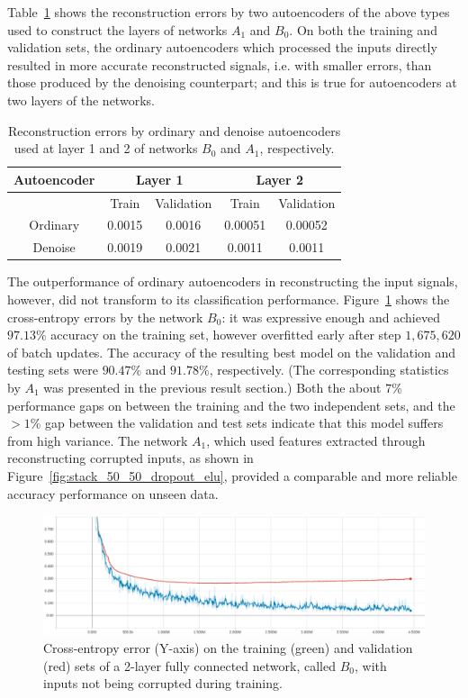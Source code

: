 \documentclass[12pt]{article}
\begin{document}
Table~\ref{tab:reconstruction_errors} shows the reconstruction errors by two autoencoders of the above types used to construct the layers of networks $A_1$ and $B_0$. On both the training and validation sets, the ordinary autoencoders which processed the inputs directly resulted in more accurate reconstructed signals, i.e. with smaller errors, than those produced by the denoising counterpart; and this is true for autoencoders at two layers of the networks.

\begin{table}[!htbp]
\centering
\begin{tabular}{*5c}
\toprule
Autoencoder &  \multicolumn{2}{c}{Layer 1} & \multicolumn{2}{c}{Layer 2}\\
\midrule
{}         & Train   & Validation    & Train   & Validation\\
Ordinary   & 0.0015  & 0.0016   & 0.00051  & 0.00052\\
Denoise    &  0.0019  &  0.0021   & 0.0011  & 0.0011\\
\bottomrule
\end{tabular}
\caption{Reconstruction errors by ordinary and denoise autoencoders used at layer 1 and 2 of networks $B_0$ and $A_1$, respectively.}
\label{tab:reconstruction_errors}
\end{table}

The outperformance of ordinary autoencoders in reconstructing the input signals, however, did not transform to its classification performance. Figure~\ref{fig:stack_50_50_dropout_elu_clean_input} shows the cross-entropy errors by the network $B_0$: it was expressive enough and achieved $97.13\%$ accuracy on the training set, however overfitted early after step $1,675,620$ of batch updates. The accuracy of the resulting best model on the validation and testing sets were $90.47\%$ and $91.78\%$, respectively. (The corresponding statistics by $A_1$ was presented in the previous result section.) Both the about $7\%$ performance gaps on between the training and the two independent sets, and the $>1\%$ gap between the validation and test sets indicate that this model suffers from high variance. The network $A_1$, which used features extracted through reconstructing corrupted inputs, as shown in Figure~\ref{fig:stack_50_50_dropout_elu}, provided a comparable and more reliable accuracy performance on unseen data.

\begin{figure}
  \includegraphics[width=\linewidth]{figures/stack_50_50_dropout_elu_clean_input/stack_50_50_dropout_elu_clean_input.eps}
  \caption{Cross-entropy error (Y-axis) on the training (green) and validation (red) sets of a 2-layer fully connected network, called $B_0$, with inputs not being corrupted during training.}
  \label{fig:stack_50_50_dropout_elu_clean_input}
\end{figure}
\end{document}
